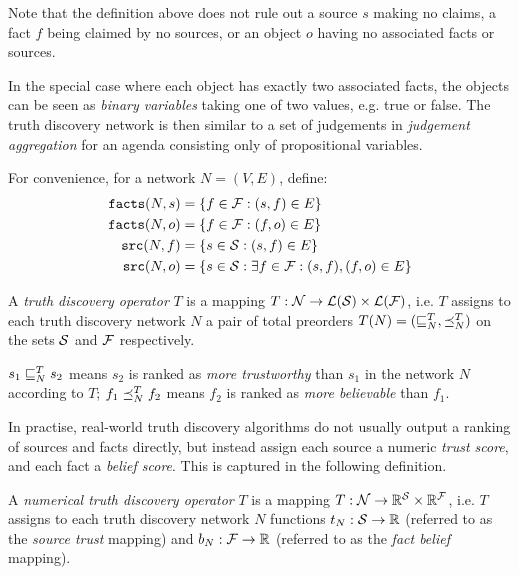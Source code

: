 \documentclass[../main.tex]{subfiles}
\begin{document}
\begin{remark}
Note that the definition above does not rule out a source $s$ making no claims,
a fact $f$ being claimed by no sources, or an object $o$ having no associated
facts or sources.

In the special case where each object has exactly two associated facts, the
objects can be seen as \emph{binary variables} taking one of two values, e.g.
true or false. The truth discovery network is then similar to a set of
judgements in \emph{judgement aggregation} \cite{handbook_ja} for an agenda
consisting only of propositional variables.
\end{remark}

\begin{notation}
For convenience, for a network $N=(V, E)$, define:
\begin{align*}
    \fact(N, s) &= \{f \in \F : (s, f) \in E\} \\
    \fact(N, o) &= \{f \in \F : (f, o) \in E\} \\
    \src(N, f) &= \{s \in \S : (s, f) \in E\} \\
    \src(N, o) &= \{s \in \S : \exists f \in \F : (s, f), (f, o) \in E\} \\
\end{align*}
\end{notation}

\begin{definition}
\label{def:truth_discovery_operator}

A \emph{truth discovery operator} $T$ is a mapping $T: \N \rightarrow
\orderings(\S) \times \orderings(\F)$, i.e. $T$ assigns to each truth discovery
network $N$ a pair of total preorders $T(N) = (\sle_N^T, \fle_N^T)$ on the sets
$\S$ and $\F$ respectively.

$s_1 \sle_N^T s_2$ means $s_2$ is ranked as \emph{more trustworthy} than $s_1$
in the network $N$ according to $T$; $f_1 \fle_N^T f_2$ means $f_2$ is ranked
as \emph{more believable} than $f_1$.

\end{definition}

In practise, real-world truth discovery algorithms do not usually output a
ranking of sources and facts directly, but instead assign each source a numeric
\emph{trust score}, and each fact a \emph{belief score}. This is captured in
the following definition.

\begin{definition}
\label{def:numerical}

A \emph{numerical truth discovery operator} $T$ is a mapping $T: \N \rightarrow
\R^\S \times \R^\F$, i.e. $T$ assigns to each truth discovery network $N$
functions $t_N: \S \rightarrow \R$ (referred to as the \emph{source trust}
mapping) and $b_N: \F \rightarrow \R$ (referred to as the \emph{fact belief}
mapping).

\end{definition}
\end{document}
